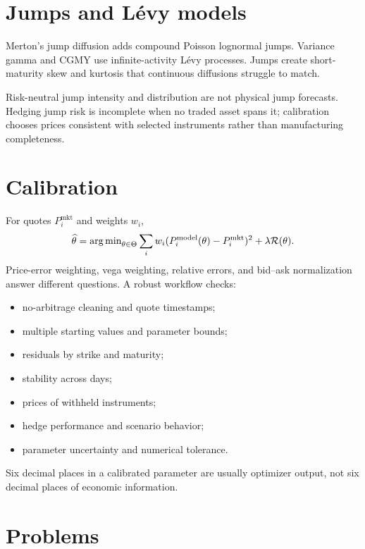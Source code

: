 \section{Jumps and Lévy models}

Merton's jump diffusion adds compound Poisson lognormal jumps. Variance gamma and
CGMY use infinite-activity Lévy processes. Jumps create short-maturity skew and
kurtosis that continuous diffusions struggle to match.

Risk-neutral jump intensity and distribution are not physical jump forecasts.
Hedging jump risk is incomplete when no traded asset spans it; calibration chooses
prices consistent with selected instruments rather than manufacturing completeness.

\section{Calibration}

For quotes $P_i^{\mathrm{mkt}}$ and weights $w_i$,
\[
\widehat\theta=
\operatorname{arg\,min}_{\theta\in\Theta}
\sum_iw_i(P_i^{\mathrm{model}}(\theta)-P_i^{\mathrm{mkt}})^2
+\lambda\mathcal R(\theta).
\]
Price-error weighting, vega weighting, relative errors, and bid--ask normalization
answer different questions. A robust workflow checks:

\begin{itemize}
\item no-arbitrage cleaning and quote timestamps;
\item multiple starting values and parameter bounds;
\item residuals by strike and maturity;
\item stability across days;
\item prices of withheld instruments;
\item hedge performance and scenario behavior;
\item parameter uncertainty and numerical tolerance.
\end{itemize}

\begin{warning}
Six decimal places in a calibrated parameter are usually optimizer output, not six
decimal places of economic information.
\end{warning}

\section{Problems}

